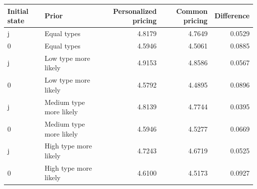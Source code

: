\begin{tabular}{llrrr}\hline
Initial state & Prior & Personalized pricing & Common pricing & Difference\\\hline
j & Equal types & 4.8179 & 4.7649 & 0.0529 \\
0 & Equal types & 4.5946 & 4.5061 & 0.0885 \\
j & Low type more likely & 4.9153 & 4.8586 & 0.0567 \\
0 & Low type more likely & 4.5792 & 4.4895 & 0.0896 \\
j & Medium type more likely & 4.8139 & 4.7744 & 0.0395 \\
0 & Medium type more likely & 4.5946 & 4.5277 & 0.0669 \\
j & High type more likely & 4.7243 & 4.6719 & 0.0525 \\
0 & High type more likely & 4.6100 & 4.5173 & 0.0927 \\
\hline\end{tabular}
